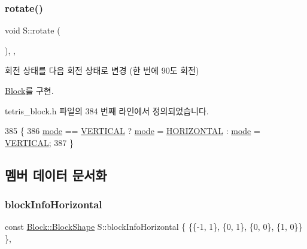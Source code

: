\subsubsection{\texorpdfstring{rotate()}{rotate()}}
{\footnotesize\ttfamily void S\+::rotate (\begin{DoxyParamCaption}{ }\end{DoxyParamCaption})\hspace{0.3cm}{\ttfamily [inline]}, {\ttfamily [override]}, {\ttfamily [virtual]}}



회전 상태를 다음 회전 상태로 변경 (한 번에 90도 회전) 



\mbox{\hyperlink{class_block_af1499ad7e48fb750581b471d0d5bb0e0}{Block}}를 구현.



tetris\+\_\+block.\+h 파일의 384 번째 라인에서 정의되었습니다.


\begin{DoxyCode}
385     \{
386         \mbox{\hyperlink{class_s_a0a3c150f9afbfe65a5558d947b999776}{mode}} == \mbox{\hyperlink{class_block_a33a96023993478ad4b52426188454765a76628d7877667ccb2f6e549b89466a4a}{VERTICAL}} ? \mbox{\hyperlink{class_s_a0a3c150f9afbfe65a5558d947b999776}{mode}} = \mbox{\hyperlink{class_block_a33a96023993478ad4b52426188454765a883bda1b4a0cb6d25d8b3c3465f0cfef}{HORIZONTAL}} : \mbox{\hyperlink{class_s_a0a3c150f9afbfe65a5558d947b999776}{mode}} = 
      \mbox{\hyperlink{class_block_a33a96023993478ad4b52426188454765a76628d7877667ccb2f6e549b89466a4a}{VERTICAL}};
387     \}
\end{DoxyCode}


\subsection{멤버 데이터 문서화}
\mbox{\label{class_s_ac96253e642b4d209abc7ea47aa687999}} 
\subsubsection{\texorpdfstring{block\+Info\+Horizontal}{blockInfoHorizontal}}
{\footnotesize\ttfamily const \mbox{\hyperlink{class_block_aca5d951639f113e2ebd7856209d6b9ab}{Block\+::\+Block\+Shape}} S\+::block\+Info\+Horizontal \{ \{\{-\/1, 1\}, \{0, 1\}, \{0, 0\}, \{1, 0\}\} \}\hspace{0.3cm}{\ttfamily [static]}, {\ttfamily [private]}}



